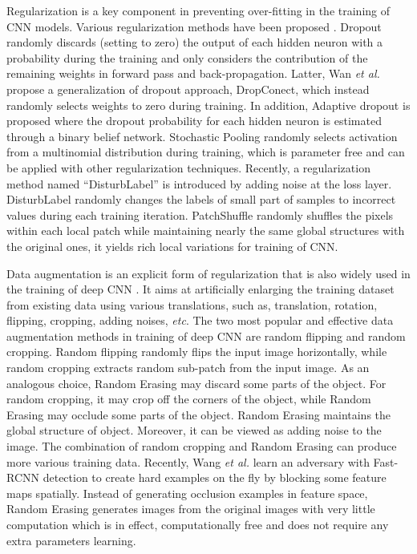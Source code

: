 \documentclass[10pt,twocolumn,letterpaper]{article}
\begin{document}
Regularization is a key component in preventing over-fitting in the training of CNN models. Various regularization methods have been proposed \cite{alexnet,dropconnect,ba2013adaptive,zeiler2013stochastic,xie2016disturblabel, kang2017patchshuffle}. Dropout \cite{alexnet} randomly discards (setting to zero) the output of each hidden neuron with a probability during the training and only considers the contribution of the remaining weights in forward pass and back-propagation. 
Latter, Wan \emph{et al.} \cite{dropconnect} propose a generalization of dropout approach, DropConect, which instead randomly selects weights to zero during training. In addition, Adaptive dropout  \cite{ba2013adaptive} is proposed where the dropout probability for each hidden neuron is estimated through a binary belief network. Stochastic Pooling \cite{zeiler2013stochastic} randomly selects activation from a multinomial distribution during training, which is parameter free and can be applied with other regularization techniques. Recently, a regularization method named ``DisturbLabel'' \cite{xie2016disturblabel} is introduced by adding noise at the loss layer. DisturbLabel randomly changes the labels of small part of samples to incorrect values during each training iteration. PatchShuffle \cite{kang2017patchshuffle} randomly shuffles the pixels within each local patch while maintaining nearly the same global structures with the original ones, it yields rich local variations for training of CNN.

Data augmentation is an explicit form of regularization that is also widely used in the training of deep CNN \cite{alexnet,vgg, resnet}.
It aims at artificially enlarging the training dataset from existing data using various translations, such as, translation, rotation, flipping, cropping, adding noises, \emph{etc}. 
The two most popular and effective data augmentation methods in training of deep CNN are
random flipping and random cropping. Random flipping randomly flips the input image horizontally, while random cropping extracts random sub-patch from the input image.
As an analogous choice, Random Erasing may discard some parts of the object. For random cropping, it may crop off the corners of the object, while Random Erasing may occlude some parts of the object. Random Erasing maintains the global structure of object. Moreover, it can be viewed as adding noise to the image. The combination of random cropping and Random Erasing can produce more various training data. Recently, Wang \emph{et al.} \cite{A-fast-rcnn} learn an adversary with Fast-RCNN \cite{fast-rcnn} detection to create hard examples on the fly by blocking some feature maps spatially. Instead of generating occlusion examples in feature space, Random Erasing generates images from the original images with very little computation which is in effect, computationally free and does not require any extra parameters learning.
\end{document}
